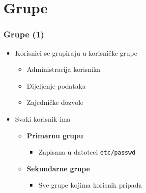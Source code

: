 \documentclass[table,usenames,dvipsnames] {beamer}
\newcommand{\shell}[1]{\texttt{#1}}
\begin{document}
\section{Grupe}
\begin{frame}[t]
\frametitle{Grupe (1)}
\begin{itemize}
  \item Korisnici se grupiraju u korisničke grupe
  \begin{itemize}
  	\item Administracija korisnika
  	\item Dijeljenje podataka
  	\item Zajedničke dozvole
  \end{itemize}
  \item Svaki korisnik ima
  \begin{itemize}
    \item[] \textbf{Primarnu grupu}
    \begin{itemize}
      \item Zapisana u datoteci \shell{etc/passwd} 
    \end{itemize}
    \item[] \textbf{Sekundarne grupe}
    \begin{itemize}
      \item  Sve grupe kojima korisnik pripada
    \end{itemize}
  \end{itemize}
\end{itemize}
\end{frame}
\end{document}
